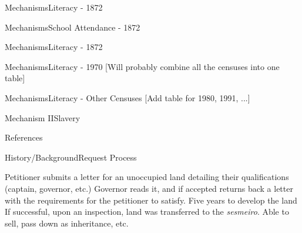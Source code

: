 \documentclass[aspectratio=1610]{beamer}
\begin{document}
\begin{frame}{Mechanisms}{Literacy - 1872}
    \footnotesize
    
\end{frame}

\begin{frame}{Mechanisms}{School Attendance - 1872}
    \tiny
    
\end{frame}

\begin{frame}{Mechanisms}{Literacy - 1872}
    \footnotesize
    
\end{frame}

\begin{frame}{Mechanisms}{Literacy - 1970}
    [Will probably combine all the censuses into one table]
    \footnotesize
    
\end{frame}

\begin{frame}{Mechanisms}{Literacy - Other Censuses}
    [Add table for 1980, 1991, ...]
\end{frame}

\begin{frame}{Mechanism II}{Slavery}
    \tiny
    
\end{frame}

\begin{frame}{References}
    \printbibliography
\end{frame}

\appendix

\begin{frame}{History/Background}{Request Process}
    \begin{outline}
        \1 Petitioner submits a letter for an unoccupied land detailing their qualifications (captain, governor, etc.)
        \vspace{1mm}
        \1 Governor reads it, and if accepted returns back a letter with the requirements for the petitioner to satisfy.
        \vspace{1mm}
        \1 Five years to develop the land
        \vspace{1mm}
        \1 If successful, upon an inspection, land was transferred to the \textit{sesmeiro}.
        \vspace{1mm}
        \1 Able to sell, pass down as inheritance, etc. 
    \end{outline}
\end{frame}
\end{document}
